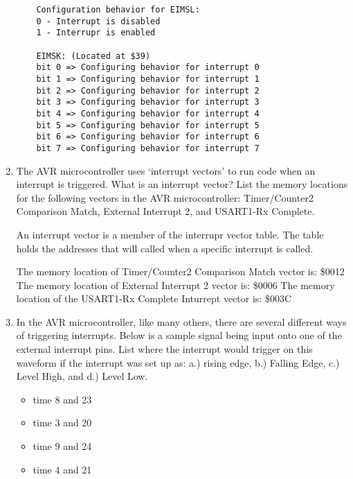 \documentclass[12pt]{article}
\begin{document}
\begin{enumerate}
\begin{verbatim}
    Configuration behavior for EIMSL:
    0 - Interrupt is disabled
    1 - Interrupr is enabled

    EIMSK: (Located at $39)
    bit 0 => Configuring behavior for interrupt 0
    bit 1 => Configuring behavior for interrupt 1
    bit 2 => Configuring behavior for interrupt 2
    bit 3 => Configuring behavior for interrupt 3
    bit 4 => Configuring behavior for interrupt 4
    bit 5 => Configuring behavior for interrupt 5
    bit 6 => Configuring behavior for interrupt 6
    bit 7 => Configuring behavior for interrupt 7

    \end{verbatim}


    \item
    The AVR microcontroller uses ‘interrupt vectors’ to run code when an interrupt is triggered.
    What is an interrupt vector? List the memory locations for the following vectors in the AVR
    microcontroller: Timer/Counter2 Comparison Match, External Interrupt 2, and USART1-Rx Complete.

    An interrupt vector is a member of the interrupr vector table. The table holds the addresses
    that will called when a specific interrupt is called.

    The memory location of Timer/Counter2 Comparison Match vector is: \$0012
    The memory location of External Interrupt 2 vector is: \$0006
    The memory location of the USART1-Rx Complete Inturrept vector is: \$003C

    \item
    In the AVR microcontroller, like many others, there are several different ways of triggering
    interrupts. Below is a sample signal being input onto one of the external interrupt pins. List where
    the interrupt would trigger on this waveform if the interrupt was set up as: a.) rising edge, b.)
    Falling Edge, c.) Level High, and d.) Level Low.

    \begin{itemize}
        \item
        time 8 and 23
        \item
        time 3 and 20
        \item
        time 9 and 24
        \item
        time 4 and 21
    \end{itemize}

\end{enumerate}
\end{document}
